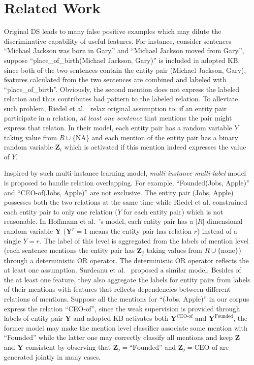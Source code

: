 \documentclass[10pt]{article} %
\theoremstyle{definition}
\theoremstyle{definition}
\begin{document}
\section{Related Work}
Original DS leads to many false positive examples which may dilute the discriminative capability of useful features. 
For instance, consider sentences ``Michael Jackson was born in Gary.'' and ``Michael Jackson moved from Gary.'', 
suppose ``place\_of\_birth(Michael Jackson, Gary)'' is included in adopted KB, 
since both of the two sentences contain the entity pair (Michael Jackson, Gary), features calculated from the two sentences are combined and labeled with ``place\_of\_birth''. 
Obviously, the second mention does not express the labeled relation and thus contributes bad pattern to the labeled relation. 
To alleviate such problem, Riedel et al.~\cite{riedel} relax original assumption to: if an entity pair participate in a relation, 
\emph{at least one sentence} that mentions the pair might express that relaton. 
In their model, each entity pair has a random variable $Y$ taking value from $R\cup{}\{\text{NA}\}$ and each mention of the entity pair has a binary random variable $\mathbf{Z}_i$ which is activated 
if this mention indeed expresses the value of $Y$. 


Inspired by such multi-instance learning model, \emph{multi-instance multi-label} model is proposed to handle relation overlapping. 
For example, ``Founded(Jobs, Apple)'' and ``CEO-of(Jobs, Apple)'' are not exclusive. 
The entity pair (Jobs, Apple) possesses both the two relations at the same time while Riedel et al. constrained each entity pair to only one relation ($Y$ for each entity pair) 
which is not reasonable. 
In Hoffmann et al.~\cite{hoffmann}'s model, each entity pair has a $\vert{}R\vert$-dimensional random variable $\mathbf{Y}$ ($\mathbf{Y}^{r}=1$ means the entity pair has relation $r$) instead of a single $Y=r$. 
The label of this level is aggregated from the labels of mention level (each sentence mentions the entity pair has $\mathbf{Z}_j$ taking values from $R\cup{}\{\text{none}\}$) 
through a deterministic OR operator. 
The deterministic OR operator reflects the at least one assumption. 
Surdeanu et al.~\cite{surdeanu} proposed a similar model. 
Besides of the at least one feature, they also aggregate the labels for entity pairs from labels of their mentions with features that reflects dependencies between different relations of mentions. 
Suppose all the mentions for ``(Jobs, Apple)'' in our corpus express the relation ``CEO-of'', 
since the weak supervision is provided through labels of entity pair $\mathbf{Y}$ and adopted KB activates both $\mathbf{Y}^{\text{CEO-of}}$ and $\mathbf{Y}^{\text{Founded}}$, the former model may 
make the mention level classifier associate some mention with ``Founded'' while the latter one may correctly classify all mentions 
and keep $\mathbf{Z}$ and $\mathbf{Y}$ consistent by observing that $\mathbf{Z}_{j}=\text{``Founded''}$ and $\mathbf{Z}_{j}=\text{CEO-of}$ are generated jointly in many cases. 
\end{document}
